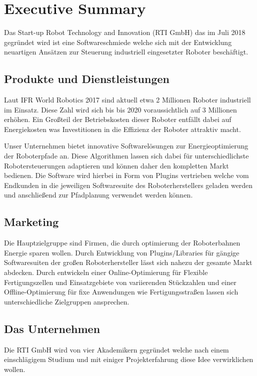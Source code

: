 \chapter{Executive Summary}

Das Start-up \textsf{Robot Technology and Innovation (RTI GmbH)} das im Juli 2018 gegründet wird ist eine Softwareschmiede welche sich mit der Entwicklung neuartigen Ansätzen zur Steuerung industriell eingesetzter Roboter beschäftigt.

\section{Produkte und Dienstleistungen}

Laut IFR World Robotics 2017 sind aktuell etwa 2 Millionen Roboter industriell im Einsatz. Diese Zahl wird sich bis bis 2020 voraussichtlich auf 3 Millionen erhöhen. Ein Großteil der Betriebskosten dieser Roboter entfällt dabei auf Energiekosten was Investitionen in die Effizienz der Roboter attraktiv macht.

Unser Unternehmen bietet innovative Softwarelösungen zur Energieoptimierung der Roboterpfade an. Diese Algorithmen lassen sich dabei für unterschiedlichste Robotersteuerungen adaptieren und können daher den kompletten Markt bedienen. Die Software wird hierbei in Form von Plugins vertrieben welche vom Endkunden in die jeweiligen Softwaresuite des Roboterherstellers geladen werden und anschließend zur Pfadplanung verwendet werden können.

\section{Marketing}

Die Hauptzielgruppe sind Firmen, die durch optimierung der Roboterbahnen Energie sparen wollen. Durch Entwicklung von Plugins/Libraries für gängige Softwaresuiten der großen Roboterhersteller lässt sich nahezu der gesamte Markt abdecken. Durch entwickeln einer Online-Optimierung für Flexible Fertigungszellen und Einsatzgebiete von variierenden Stückzahlen und einer Offline-Optimierung für fixe Anwendungen wie Fertigungsstraßen lassen sich unterschiedliche Zielgruppen ansprechen.

\section{Das Unternehmen}

Die \textsf{RTI GmbH} wird von vier Akademikern gegründet welche nach einem einschlägigem Studium und mit einiger Projekterfahrung diese Idee verwirklichen wollen.

